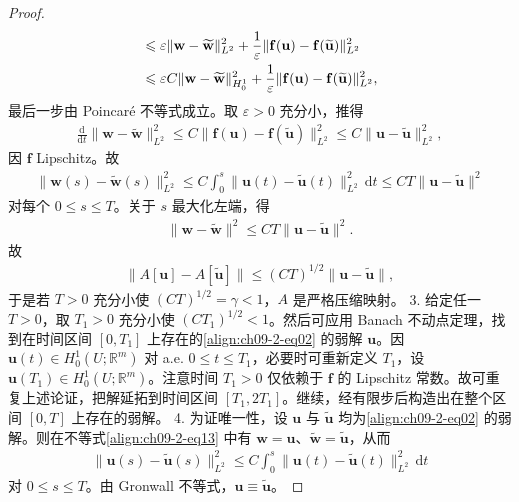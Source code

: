 \documentclass[../../main.tex]{subfiles}
\begin{document}
\begin{example}[反应扩散方程]
\begin{theorem}[存在性]
\begin{proof}
\begin{align}
&\leqslant\varepsilon\|\mathbf{w}-\widetilde{\mathbf{w}}\|_{L^2}^2+\frac1\varepsilon\|\mathbf{f}(\mathbf{u})-\mathbf{f}(\widetilde{\mathbf{u}})\|_{L^2}^2\notag\\
&\leqslant\varepsilon C\|\mathbf{w}-\widetilde{\mathbf{w}}\|_{H_0^1}^2+\frac1\varepsilon\|\mathbf{f}(\mathbf{u})-\mathbf{f}(\widetilde{\mathbf{u}})\|_{L^2}^2,\label{align:ch09-2-eq12}
\end{align}
最后一步由 Poincaré 不等式成立。取 $\varepsilon>0$ 充分小，推得
\begin{align*}
\frac{\mathrm{d}}{\mathrm{d}t}\|\mathbf{w}-\widetilde{\mathbf{w}}\|_{L^2}^2\leqslant C\|\mathbf{f}(\mathbf{u})-\mathbf{f}(\widetilde{\mathbf{u}})\|_{L^2}^2\leqslant C\|\mathbf{u}-\widetilde{\mathbf{u}}\|_{L^2}^2,
\end{align*}
因 $\mathbf{f}$ Lipschitz。故
\begin{align}
\|\mathbf{w}(s)-\widetilde{\mathbf{w}}(s)\|_{L^2}^2\leqslant C\int_0^s\|\mathbf{u}(t)-\widetilde{\mathbf{u}}(t)\|_{L^2}^2\,\mathrm{d}t\leqslant CT\|\mathbf{u}-\widetilde{\mathbf{u}}\|^2\label{align:ch09-2-eq13}
\end{align}
对每个 $0\leqslant s\leqslant T$。关于 $s$ 最大化左端，得
\begin{align*}
\|\mathbf{w}-\widetilde{\mathbf{w}}\|^2\leqslant CT\|\mathbf{u}-\widetilde{\mathbf{u}}\|^2.
\end{align*}
故
\begin{align}
\|A[\mathbf{u}]-A[\widetilde{\mathbf{u}}]\|\leqslant(CT)^{1/2}\|\mathbf{u}-\widetilde{\mathbf{u}}\|,\label{align:ch09-2-eq14}
\end{align}
于是若 $T>0$ 充分小使 $(CT)^{1/2}=\gamma<1$，$A$ 是严格压缩映射。
3. 给定任一 $T>0$，取 $T_1>0$ 充分小使 $(CT_1)^{1/2}<1$。然后可应用 Banach 不动点定理，找到在时间区间 $[0,T_1]$ 上存在的\eqref{align:ch09-2-eq02} 的弱解 $\mathbf{u}$。因 $\mathbf{u}(t)\in H_0^1(U;\mathbb{R}^m)$ 对 a.e. $0\leqslant t\leqslant T_1$，必要时可重新定义 $T_1$，设 $\mathbf{u}(T_1)\in H_0^1(U;\mathbb{R}^m)$。注意时间 $T_1>0$ 仅依赖于 $\mathbf{f}$ 的 Lipschitz 常数。故可重复上述论证，把解延拓到时间区间 $[T_1,2T_1]$。继续，经有限步后构造出在整个区间 $[0,T]$ 上存在的弱解。
4. 为证唯一性，设 $\mathbf{u}$ 与 $\widetilde{\mathbf{u}}$ 均为\eqref{align:ch09-2-eq02} 的弱解。则在不等式\eqref{align:ch09-2-eq13} 中有 $\mathbf{w}=\mathbf{u}$、$\widetilde{\mathbf{w}}=\widetilde{\mathbf{u}}$，从而
\begin{align*}
\|\mathbf{u}(s)-\widetilde{\mathbf{u}}(s)\|_{L^2}^2\leqslant C\int_0^s\|\mathbf{u}(t)-\widetilde{\mathbf{u}}(t)\|_{L^2}^2\,\mathrm{d}t
\end{align*}
对 $0\leqslant s\leqslant T$。由 Gronwall 不等式，$\mathbf{u}\equiv\widetilde{\mathbf{u}}$。
\end{proof}
\end{theorem}
\end{example}
\end{document}
